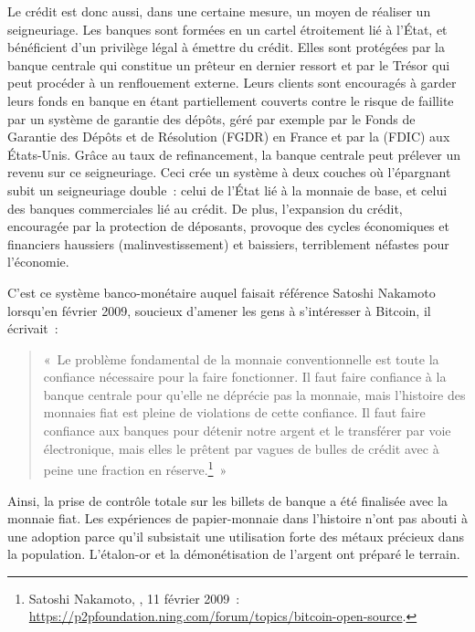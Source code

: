 Le crédit est donc aussi, dans une certaine mesure, un moyen de réaliser un seigneuriage. Les banques sont formées en un cartel étroitement lié à l'État, et bénéficient d'un privilège légal à émettre du crédit. Elles sont protégées par la banque centrale qui constitue un prêteur en dernier ressort et par le Trésor qui peut procéder à un renflouement externe. Leurs clients sont encouragés à garder leurs fonds en banque en étant partiellement couverts contre le risque de faillite par un système de garantie des dépôts, géré par exemple par le Fonds de Garantie des Dépôts et de Résolution (FGDR) en France et par la  (FDIC) aux États-Unis. Grâce au taux de refinancement, la banque centrale peut prélever un revenu sur ce seigneuriage. Ceci crée un système à deux couches où l'épargnant subit un seigneuriage double~: celui de l'État lié à la monnaie de base, et celui des banques commerciales lié au crédit. De plus, l'expansion du crédit, encouragée par la protection de déposants, provoque des cycles économiques et financiers haussiers (malinvestissement) et baissiers, terriblement néfastes pour l'économie.

C'est ce système banco-monétaire auquel faisait référence Satoshi Nakamoto lorsqu'en février 2009, soucieux d'amener les gens à s'intéresser à Bitcoin, il écrivait~:

\begin{quote}
«~Le problème fondamental de la monnaie conventionnelle est toute la confiance nécessaire pour la faire fonctionner. Il faut faire confiance à la banque centrale pour qu'elle ne déprécie pas la monnaie, mais l'histoire des monnaies fiat est pleine de violations de cette confiance. Il faut faire confiance aux banques pour détenir notre argent et le transférer par voie électronique, mais elles le prêtent par vagues de bulles de crédit avec à peine une fraction en réserve.\footnote{Satoshi Nakamoto, , 11 février 2009~: \url{https://p2pfoundation.ning.com/forum/topics/bitcoin-open-source}.}~»
\end{quote}



Ainsi, la prise de contrôle totale sur les billets de banque a été finalisée avec la monnaie fiat. Les expériences de papier-monnaie dans l'histoire n'ont pas abouti à une adoption parce qu'il subsistait une utilisation forte des métaux précieux dans la population. L'étalon-or et la démonétisation de l'argent ont préparé le terrain.


